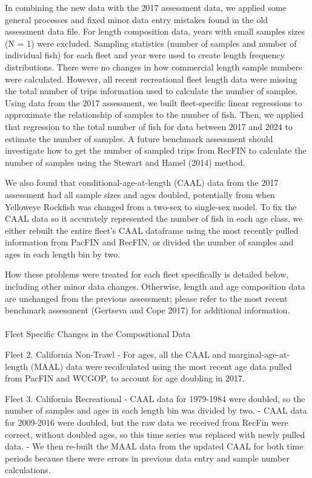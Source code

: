 \documentclass[
]{scrartcl}
\makeatletter
\let\oldparagraph\paragraph
\renewcommand{\paragraph}{
    \@ifstar
      \xxxParagraphStar
      \xxxParagraphNoStar
  }
\newcommand{\xxxParagraphStar}[1]{\oldparagraph*{#1}\mbox{}}
\newcommand{\xxxParagraphNoStar}[1]{\oldparagraph{#1}\mbox{}}
\makeatother
\begin{document}
In combining the new data with the 2017 assessment data, we applied some
general processes and fixed minor data entry mistakes found in the old
assessment data file. For length composition data, years with small
samples sizes (N = 1) were excluded. Sampling statistics (number of
samples and number of individual fish) for each fleet and year were used
to create length frequency distributions. There were no changes in how
commercial length sample numbers were calculated. However, all recent
recreational fleet length data were missing the total number of trips
information used to calculate the number of samples. Using data from the
2017 assessment, we built fleet-specific linear regressions to
approximate the relationship of samples to the number of fish. Then, we
applied that regression to the total number of fish for data between
2017 and 2024 to estimate the number of samples. A future benchmark
assessment should investigate how to get the number of sampled trips
from RecFIN to calculate the number of samples using the Stewart and
Hamel (2014) method.

We also found that conditional-age-at-length (CAAL) data from the 2017
assessment had all sample sizes and ages doubled, potentially from when
Yelloweye Rockfish was changed from a two-sex to single-sex model. To
fix the CAAL data so it accurately represented the number of fish in
each age class, we either rebuilt the entire fleet's CAAL dataframe
using the most recently pulled information from PacFIN and RecFIN, or
divided the number of samples and ages in each length bin by two.

How these problems were treated for each fleet specifically is detailed
below, including other minor data changes. Otherwise, length and age
composition data are unchanged from the previous assessment; please
refer to the most recent benchmark assessment (Gertseva and Cope 2017)
for additional information.

\paragraph{Fleet Specific Changes in the Compositional
Data}\label{fleet-specific-changes-in-the-compositional-data}

Fleet 2. California Non-Trawl - For ages, all the CAAL and
marginal-age-at-length (MAAL) data were recalculated using the most
recent age data pulled from PacFIN and WCGOP, to account for age
doubling in 2017.

Fleet 3. California Recreational - CAAL data for 1979-1984 were doubled,
so the number of samples and ages in each length bin was divided by two.
- CAAL data for 2009-2016 were doubled, but the raw data we received
from RecFin were correct, without doubled ages, so this time series was
replaced with newly pulled data. - We then re-built the MAAL data from
the updated CAAL for both time periods because there were errors in
previous data entry and sample number calculations.
\end{document}
